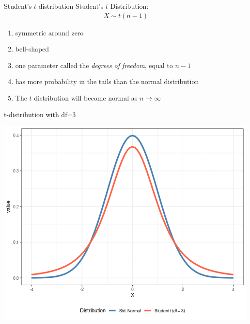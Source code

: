 \documentclass{beamer}
\begin{document}
\begin{frame}{Student's $t$-distribution}
Student's $t$ Distribution:
\begin{align*}
X \sim t(n-1)
\end{align*}

\begin{enumerate}
\item symmetric around zero
\item bell-shaped
\item one parameter called the \textit{degrees of freedom}, equal to $n-1$
\item has more probability in the tails than the normal distribution
\item The $t$ distribution will become normal as $n \rightarrow \infty$
\end{enumerate}
\end{frame}

\begin{frame}{t-distribution with df=3}
\begin{center}
\includegraphics[scale=0.5]{t3.png}
\end{center}
\end{frame}
\end{document}
